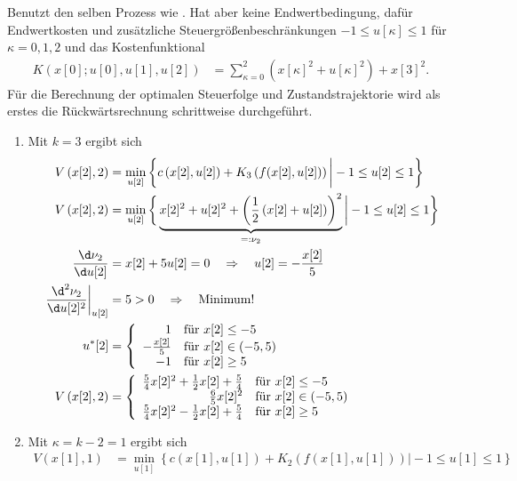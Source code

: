 \begin{exmp}
Benutzt den selben Prozess wie . Hat aber keine Endwertbedingung, dafür Endwertkosten und zusätzliche
Steuergrößenbeschränkungen $-1\leq u[\kappa]\leq 1$ für $\kappa=0,1,2$ und das Kostenfunktional
\begin{align*}
	K\left(x[0];u[0],u[1],u[2]\right) & = \sum\limits_{\kappa=0}^2\left(x[\kappa]^2+u[\kappa]^2 \right) + x[3]^2.
\end{align*}
Für die Berechnung der optimalen Steuerfolge und Zustandstrajektorie wird als erstes die Rückwärtsrechnung schrittweise durchgeführt. 
\begin{enumerate}[label=(S\arabic*)]
  \item Mit $k=3$ ergibt sich
\begin{align*}
	V\left(x[2],2\right) & = \min\limits_{u[2]}\left\{c\left(x[2],u[2]\right) + K_3\left(f(x[2],u[2]) \right)\bigg| -1\leq u[2]\leq 1 \right\}\\
	V\left(x[2],2\right) & = \min\limits_{u[2]}\bigg\{\underbrace{x[2]^2+u[2]^2+\left(\frac12\left(x[2]+u[2]\right) \right)^2}_{=:\nu_2} \bigg| -1\leq
	u[2] \leq 1 \bigg\}\\
	\frac{\d \nu_2}{\d u[2]} & = x[2]+5u[2]=0\quad \Rightarrow \quad u[2]=-\frac{x[2]}{5}\\
	\left.\frac{\d^2 \nu_2}{\d u[2]^2}\right|_{u[2]} & = 5 > 0 \quad \Rightarrow\quad\text{Minimum!}\\
	u^{\ast}[2] & = \left\{\begin{array}{rl}
	1 & \text{für } x[2]\leq -5\\
	-\frac{x[2]}{5} & \text{für } x[2]\in(-5,5)\\
	-1 & \text{für } x[2]\geq 5
	\end{array} \right.\\
	V\left(x[2],2\right) & = \left\{\begin{array}{rl}
	\frac54x[2]^2+\frac12x[2]+\frac54 & \text{für } x[2]\leq -5\\
	\frac65x[2]^2 & \text{für } x[2]\in(-5,5)\\
	\frac54x[2]^2-\frac12x[2]+\frac54 & \text{für }x[2]\geq 5
	\end{array}
	\right.
\end{align*}
	\item Mit $\kappa = k - 2 = 1$ ergibt sich
\begin{align*}
	V\left(x[1],1\right) & = \min\limits_{u[1]}\left\{c\left(x[1],u[1]\right) + K_2\left(f(x[1],u[1]) \right)\bigg| -1\leq u[1]\leq 1 \right\}\\

\end{align*}
\end{enumerate}
\end{exmp}
